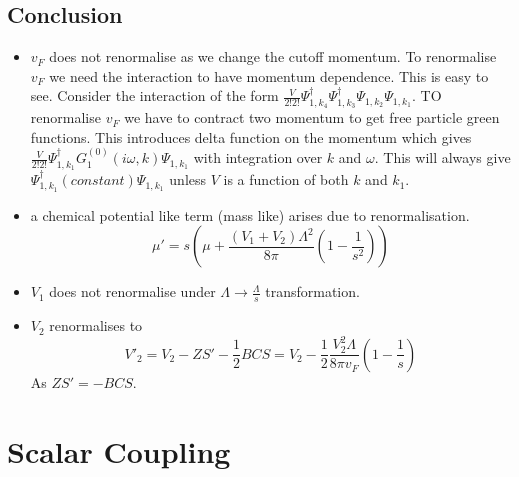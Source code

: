 \documentclass[a4paper]{article}
\begin{document}
    \subsection{Conclusion}
        \begin{itemize}
            \item $v_F$ does not renormalise as we change the cutoff momentum. To renormalise $v_F$ we need the interaction to have momentum dependence. This is easy to see. Consider the interaction of the form $\frac{V}{2!2!} \Psi^{\dagger}_{1,k_4}\Psi^{\dagger}_{1,k_3}\Psi_{1,k_2}\Psi_{1,k_1}$. TO renormalise $v_F$ we have to contract two momentum to get free particle green functions. This introduces delta function on the momentum which gives $\frac{V}{2!2!} \Psi^{\dagger}_{1,k_1}G^{(0)}_1(i\omega,k)\Psi_{1,k_1}$ with integration over $k$ and $\omega$. This will always give $\Psi^{\dagger}_{1,k_1}(constant)\Psi_{1,k_1}$ unless $V$ is a function of both $k$ and $k_1$.
            \item a chemical potential like term (mass like) arises due to renormalisation.
            \begin{equation}
                \mu' = s\left( \mu + \frac{(V_1+V_2)\Lambda^2}{8\pi}\left(1 - \frac{1}{s^2} \right) \right)
            \end{equation}
            \item $V_1$ does not renormalise under $\Lambda \to \frac{\Lambda}{s}$ transformation.
            \item $V_2$ renormalises to
            \begin{equation}
                V'_2 = V_2 - ZS' - \frac{1}{2}BCS
                     = V_2 -\frac{1}{2}\frac{V^2_2\Lambda}{8\pi v_F}\left(1- \frac{1}{s}\right)
            \end{equation}
            As $ZS' = - BCS$.

        \end{itemize}
    \section{Scalar Coupling}
        
\end{document}
